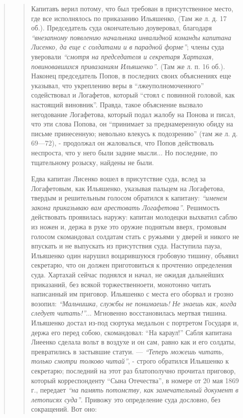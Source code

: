 \begin{quote}
\begin{quote}
Капитавъ верил потому, что был требован в присутственное место, где все исполнялось 
по приказанию Ильяшенко, (Там же л. д. 17 об.). Председатель суда окончательно доуверовал, 
благодаря
\emph{``внезапному появлению начальника инвалидной команды капитана Лисенко, 
да еще с солдатами и в парадной форме''};
члены суда уверовали \emph{``смотря на председателя и секретаря
Хартахая, повиновавшихся привазаниям Ильяшенко''}. (Там
же л. п. 16 об.). Наконец председатель Попов, в последних своих объяснениях еще
указывал, 
что укреплению веры в ``лжеуполномоченного'' содействовал и Логафетов, который ``стоял с повинной головой, как настоящий
виновник''.
Правда, такое объяснение вызвало негодование
Логафетова, который подал жалобу на Понова и писал,
что эти слова Попова, он ``принимает за преднамеренную
обиду на письме принесенную; невольно влекусь к подозрению'' (там же л. д. 69—72), - продолжал он 
жаловалься, что Попов действоваль неспроста, что у него
были задние мысли... Но последние, по тщательному розыску,
найдены не были.

Едва капитан Лисенко вошел в присутствие суда,
вслед за Логафетовым, как Ильяшенко, указывая пальцем на 
Логафетова, твердым и решительным голосом
обратился к капитану: \emph{``именем закона приказываю вам
арестовать Логафетова''}. Решимость действовать проявилась
наружу: капитан молодецки выхватил саблю из ножен
и, держа в руке это оружие поднятым вверх, громовым
голосом скомандовал солдатам стать с ружьями у дверей
и никого не впускать и не выпускать из присутствия
суда. Наступила пауза, Ильяшенко один нарушил воцарившуюся 
гробовую тишину, объявил секретарю, что он
должен приготовиться к прочтенио определения суда. Хартахай сейчас 
поднялся и начал, не ожидая дальнейших
приказаний, без всякой торжественноети, монотонно читать
написанный им приговор. Ильяшенко с места его оборвал 
и грозно возопил: \emph{``Мальчишка, службы не понимаешь!
Не знаешь как, когда следует читать!''}... Мгновенно восстановилась 
мертвая тишина. Ильяшенко достал из-под
сюртука медальон с портретом Государя и, держа его
перед собою, скомандовал: ``На караул!'' Сабля капитана
Лиеенко сделала вольт в воздухе и он сам, равно как
и его солдаты, превратились в застывшие статуи. — \emph{``Теперь
можешь читать, только смотри толково читай''}, - строго обратился
Ильяшенко к секретарю; последний на этот раз
блатополучно прочитал приговор, который корреспонденту
``Сына Отечества'', в номере от 20 мая 1869 г., передает \emph{``на память потомству, как замечательный документ
в летописях суда''}. Привожу это определение суда дословно, без сокращений. Вот оно:
\begin{quote}
\em\bfseries
	

\end{quote}
\end{quote}
\end{quote}
